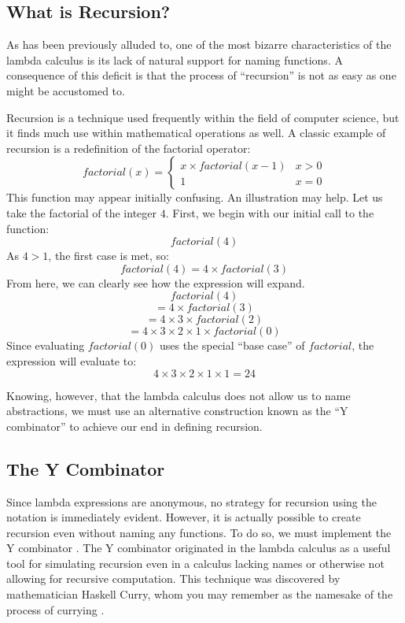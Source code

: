 \documentclass[twocolumn,titlepage,12pt]{article}
\begin{document}
\subsection{What is Recursion?}
As has been previously alluded to, one of the most bizarre characteristics of the lambda calculus is its lack of natural support for naming functions. A consequence of this deficit is that the process of ``recursion'' is not as easy as one might be accustomed to.

Recursion is a technique used frequently within the field of computer science, but it finds much use within mathematical operations as well. A classic example of recursion is a redefinition of the factorial operator:
\[
factorial(x)=
\begin{cases}
    x\times factorial(x-1) & x>0 \\
    1 & x=0
\end{cases}
\]
This function may appear initially confusing. An illustration may help. Let us take the factorial of the integer $4$. First, we begin with our initial call to the function:
$$factorial(4)$$
As $4>1$, the first case is met, so:
$$factorial(4)=4\times factorial(3)$$
From here, we can clearly see how the expression will expand.
$$factorial(4)$$
$$=4\times factorial(3)$$
$$=4\times 3\times factorial(2)$$
$$=4\times 3\times 2\times 1\times factorial(0)$$
Since evaluating $factorial(0)$ uses the special ``base case'' of $factorial$, the expression will evaluate to:
$$4\times 3\times 2\times 1\times 1=24$$

Knowing, however, that the lambda calculus does not allow us to name abstractions, we must use an alternative construction known as the ``Y combinator'' to achieve our end in defining recursion.

\subsection{The Y Combinator}
Since lambda expressions are anonymous, no strategy for recursion using the notation is immediately evident. However, it is actually possible to create recursion even without naming any functions. To do so, we must implement the Y combinator \cite{ycombmedium}. The Y combinator originated in the lambda calculus as a useful tool for simulating recursion even in a calculus lacking names or otherwise not allowing for recursive computation. This technique was discovered by mathematician Haskell Curry, whom you may remember as the namesake of the process of currying \cite{compphileyc}.
\end{document}
